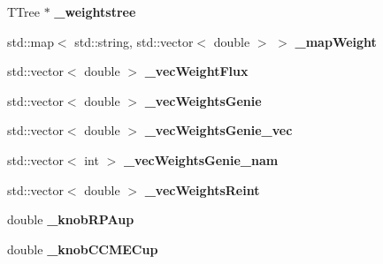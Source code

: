 \begin{DoxyCompactItemize}
\item 
T\+Tree $\ast$ {\bfseries \+\_\+weightstree}\hypertarget{classanalysis_1_1EventWeightTree_a007ac1f04819cff64bb54b6206966408}{}\label{classanalysis_1_1EventWeightTree_a007ac1f04819cff64bb54b6206966408}

\item 
std\+::map$<$ std\+::string, std\+::vector$<$ double $>$ $>$ {\bfseries \+\_\+map\+Weight}\hypertarget{classanalysis_1_1EventWeightTree_aef493db93e72288ef19cd155052fbce6}{}\label{classanalysis_1_1EventWeightTree_aef493db93e72288ef19cd155052fbce6}

\item 
std\+::vector$<$ double $>$ {\bfseries \+\_\+vec\+Weight\+Flux}\hypertarget{classanalysis_1_1EventWeightTree_a63fcb54ac96617bfa03f1c98bc941d47}{}\label{classanalysis_1_1EventWeightTree_a63fcb54ac96617bfa03f1c98bc941d47}

\item 
std\+::vector$<$ double $>$ {\bfseries \+\_\+vec\+Weights\+Genie}\hypertarget{classanalysis_1_1EventWeightTree_a27f4bcfa903da58796010d056b257f1c}{}\label{classanalysis_1_1EventWeightTree_a27f4bcfa903da58796010d056b257f1c}

\item 
std\+::vector$<$ double $>$ {\bfseries \+\_\+vec\+Weights\+Genie\+\_\+vec}\hypertarget{classanalysis_1_1EventWeightTree_a8a810f60c08a21ee2f6bfd881cf9f016}{}\label{classanalysis_1_1EventWeightTree_a8a810f60c08a21ee2f6bfd881cf9f016}

\item 
std\+::vector$<$ int $>$ {\bfseries \+\_\+vec\+Weights\+Genie\+\_\+nam}\hypertarget{classanalysis_1_1EventWeightTree_a8d2b9d134034c38e6ee22a3497951694}{}\label{classanalysis_1_1EventWeightTree_a8d2b9d134034c38e6ee22a3497951694}

\item 
std\+::vector$<$ double $>$ {\bfseries \+\_\+vec\+Weights\+Reint}\hypertarget{classanalysis_1_1EventWeightTree_a2afa517c5d3c82f395cca60f6bed1e55}{}\label{classanalysis_1_1EventWeightTree_a2afa517c5d3c82f395cca60f6bed1e55}

\item 
double {\bfseries \+\_\+knob\+R\+P\+Aup}\hypertarget{classanalysis_1_1EventWeightTree_a74fc24673f14fdd10005a3f6dfd82e94}{}\label{classanalysis_1_1EventWeightTree_a74fc24673f14fdd10005a3f6dfd82e94}

\item 
double {\bfseries \+\_\+knob\+C\+C\+M\+E\+Cup}\hypertarget{classanalysis_1_1EventWeightTree_a0c942a4125790cb86c5bbec5fde66c30}{}\label{classanalysis_1_1EventWeightTree_a0c942a4125790cb86c5bbec5fde66c30}


\end{DoxyCompactItemize}
